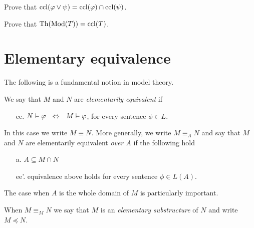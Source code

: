 \begin{exercise}
Prove that ${\rm ccl}(\varphi\vee \psi)={\rm ccl}(\varphi)\cap{\rm ccl}(\psi)$.
\end{exercise}


\begin{exercise}
Prove that ${\rm Th}(\mathop{\rm Mod}(T))={\rm ccl}(T)$.
\end{exercise}



\section{Elementary equivalence}\label{eqel}
The following is a fundamental notion in model theory.

\begin{definition}\label{def_el_eq}
We say that $M$ and $N$ are \emph{elementarily equivalent\/} if
\begin{itemize}
\item[ee.] $N\vDash\varphi\ \ \Leftrightarrow\ \ M\vDash \varphi$,\hspace{4ex} for every sentence $\phi\in L$.\smallskip
\end{itemize}
In this case we write \emph{$M\equiv N$.}
More generally, we write \emph{$M\equiv_A N$\/} and say that $M$ and $N$ are elementarily equivalent \emph{over $A$\/} if the following hold
\begin{itemize}
\item[a.] $A\subseteq M\cap N$
\item[ee'.] equivalence  above holds for every sentence $\phi\in L(A)$.
\end{itemize} 
\end{definition}

The case when $A$ is the whole domain of $M$ is particularly important.

\begin{definition}\label{def_el_sub}
When $M\equiv_M N$ we say that $M$ is an \emph{elementary substructure\/} of $N$ and write \emph{$M\preceq N$.}
\end{definition}

